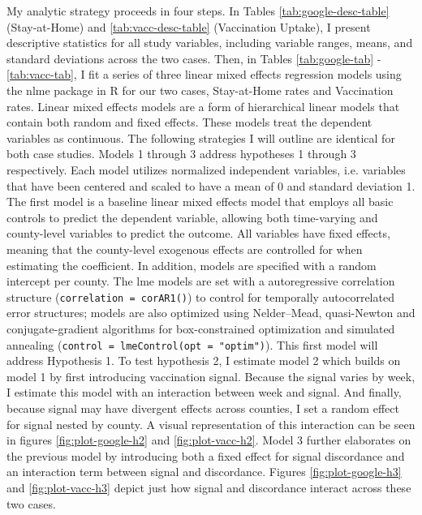 My analytic strategy proceeds in four steps. In Tables
\ref{tab:google-desc-table} (Stay-at-Home) and \ref{tab:vacc-desc-table}
(Vaccination Uptake), I present descriptive statistics for all study variables,
including variable ranges, means, and standard deviations across the two cases.
Then, in Tables \ref{tab:google-tab} - \ref{tab:vacc-tab}, I fit a series of
three linear mixed effects regression models using the nlme package in R
\citep{pinheiro_etal21, pinheiro_bates00} for our two cases, Stay-at-Home rates and
Vaccination rates. Linear mixed effects models are a form of hierarchical linear
models that contain both random and fixed effects. These models treat the
dependent variables as continuous. The following strategies I will outline are
identical for both case studies. Models 1 through 3 address hypotheses 1 through
3 respectively. Each model utilizes normalized independent variables, i.e.
variables that have been centered and scaled to have a mean of 0 and standard
deviation 1. The first model is a baseline linear mixed effects model that
employs all basic controls to predict the dependent variable, allowing both
time-varying and county-level variables to predict the outcome. All variables
have fixed effects, meaning that the county-level exogenous effects are
controlled for when estimating the coefficient. In addition, models are
specified with a random intercept per county. The lme models are set with a
autoregressive correlation structure (\texttt{correlation\ =\ corAR1()}) to control for
temporally autocorrelated error structures; models are also optimized using
Nelder--Mead, quasi-Newton and conjugate-gradient algorithms for box-constrained
optimization and simulated annealing (\texttt{control\ =\ lmeControl(opt\ =\ "optim")}).
This first model will address Hypothesis 1. To test hypothesis 2, I estimate
model 2 which builds on model 1 by first introducing vaccination signal. Because
the signal varies by week, I estimate this model with an interaction between
week and signal. And finally, because signal may have divergent effects across
counties, I set a random effect for signal nested by county. A visual
representation of this interaction can be seen in figures
\ref{fig:plot-google-h2} and \ref{fig:plot-vacc-h2}. Model 3 further
elaborates on the previous model by introducing both a fixed effect for signal
discordance and an interaction term between signal and discordance. Figures
\ref{fig:plot-google-h3} and \ref{fig:plot-vacc-h3} depict just how signal and
discordance interact across these two cases.

